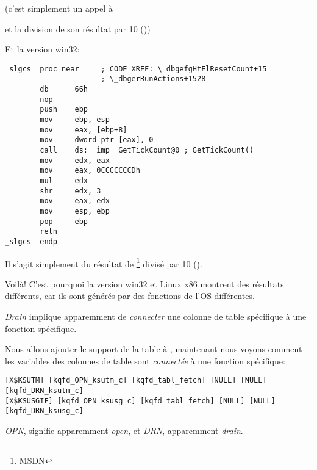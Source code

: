 (c'est simplement un appel à 

et la division de son résultat par 10 ())

Et la version win32:

\begin{lstlisting}[style=customasmx86]
_slgcs  proc near     ; CODE XREF: \_dbgefgHtElResetCount+15
                      ; \_dbgerRunActions+1528
        db      66h
        nop
        push    ebp
        mov     ebp, esp
        mov     eax, [ebp+8]
        mov     dword ptr [eax], 0
        call    ds:__imp__GetTickCount@0 ; GetTickCount()
        mov     edx, eax
        mov     eax, 0CCCCCCCDh
        mul     edx
        shr     edx, 3
        mov     eax, edx
        mov     esp, ebp
        pop     ebp
        retn
_slgcs  endp
\end{lstlisting}

Il s'agit simplement du résultat de 
\footnote{\href{http://go.yurichev.com/17248}{MSDN}}
divisé par 10 ().


Voilà! C'est pourquoi la version win32 et Linux x86 montrent des résultats différents,
car ils sont générés par des fonctions de l'\ac{OS} différentes.

\emph{Drain} implique apparemment de \emph{connecter} une colonne de table spécifique
à une fonction spécifique.

Nous allons ajouter le support de la table  à \oracletables,
maintenant nous voyons comment les variables des colonnes de table sont \emph{connectée}
à une fonction spécifique:

\begin{lstlisting}
[X$KSUTM] [kqfd_OPN_ksutm_c] [kqfd_tabl_fetch] [NULL] [NULL] [kqfd_DRN_ksutm_c]
[X$KSUSGIF] [kqfd_OPN_ksusg_c] [kqfd_tabl_fetch] [NULL] [NULL] [kqfd_DRN_ksusg_c]
\end{lstlisting}

\emph{OPN}, signifie apparemment \emph{open}, et \emph{DRN}, apparemment \emph{drain}.

